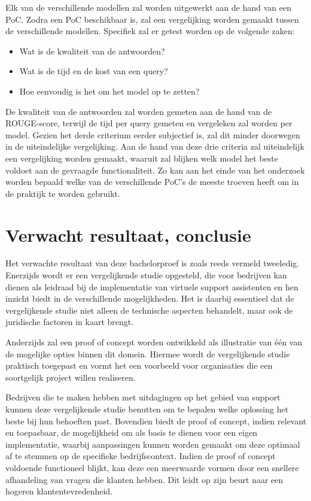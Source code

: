 Elk van de verschillende modellen zal worden uitgewerkt aan de hand van een PoC. Zodra een PoC beschikbaar is, zal een vergelijking worden gemaakt tussen de verschillende modellen. Specifiek zal er getest worden op de volgende zaken:

\begin{itemize} 
    \item Wat is de kwaliteit van de antwoorden? 
    \item Wat is de tijd en de kost van een query?
    \item Hoe eenvoudig is het om het model op te zetten? 
\end{itemize}

De kwaliteit van de antwoorden zal worden gemeten aan de hand van de ROUGE-score, terwijl de tijd per query gemeten en vergeleken zal worden per model. Gezien het derde criterium eerder subjectief is, zal dit minder doorwegen in de uiteindelijke vergelijking. Aan de hand van deze drie criteria zal uiteindelijk een vergelijking worden gemaakt, waaruit zal blijken welk model het beste voldoet aan de gevraagde functionaliteit. Zo kan aan het einde van het onderzoek worden bepaald welke van de verschillende PoC's de meeste troeven heeft om in de praktijk te worden gebruikt.


\section{Verwacht resultaat, conclusie}%
\label{sec:verwachte_resultaten}

Het verwachte resultaat van deze bachelorproef is zoals reeds vermeld tweeledig. Enerzijds wordt er een vergelijkende studie opgesteld, die voor bedrijven kan dienen als leidraad bij de implementatie van virtuele support assistenten en hen inzicht biedt in de verschillende mogelijkheden. Het is daarbij essentieel dat de vergelijkende studie niet alleen de technische aspecten behandelt, maar ook de juridische factoren in kaart brengt.

Anderzijds zal een proof of concept worden ontwikkeld als illustratie van één van de mogelijke opties binnen dit domein. Hiermee wordt de vergelijkende studie praktisch toegepast en vormt het een voorbeeld voor organisaties die een soortgelijk project willen realiseren.

Bedrijven die te maken hebben met uitdagingen op het gebied van support kunnen deze vergelijkende studie benutten om te bepalen welke oplossing het beste bij hun behoeften past. Bovendien biedt de proof of concept, indien relevant en toepasbaar, de mogelijkheid om als basis te dienen voor een eigen implementatie, waarbij aanpassingen kunnen worden gemaakt om deze optimaal af te stemmen op de specifieke bedrijfscontext. Indien de proof of concept voldoende functioneel blijkt, kan deze een meerwaarde vormen door een snellere afhandeling van vragen die klanten hebben. Dit leidt op zijn beurt naar een hogeren klantentevredenheid. 

